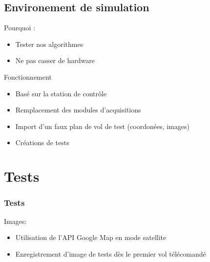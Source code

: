 \documentclass[transparent]{beamer}
\begin{document}
\subsection{Environement de simulation}

\begin{frame}
	\begin{block}{Pourquoi :}
			\begin{itemize}
				\item Tester nos algorithmes
				\item Ne pas casser de hardware
			\end{itemize}
	\end{block}
	\begin{block}{Fonctionnement}
			\begin{itemize}
				\item Basé sur la station de contrôle
				\item Remplacement des modules d'acquisitions
				\item Import d'un faux plan de vol de test (coordonées, images)
				\item Créations de tests
			\end{itemize}
	\end{block}
\end{frame}


\section{Tests}

\begin{frame}
\frametitle{Tests}
	\begin{block}{Images:}
			\begin{itemize}
				\item Utilisation de l'API Google Map en mode satellite
				\item Enregistrement d'image de tests dès le premier vol télécomandé
			\end{itemize}
	\end{block}
\end{frame}
\end{document}

